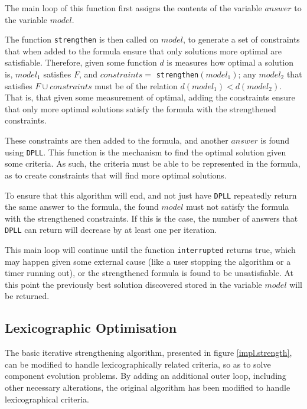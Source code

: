 The main loop of this function first assigns the contents of the variable $answer$ to the variable $model$.

The function \verb+strengthen+ is then called on $model$, to generate a set of constraints that when added to the formula ensure that only solutions more optimal are satisfiable.
Therefore, given some function $d$ is measures how optimal a solution is, $model_1$ satisfies $F$, and $constraints = $ \verb+strengthen+$(model_1)$;
any $model_2$ that satisfies $F \cup constraints$ must be of the relation $d(model_1) < d(model_2)$.
That is, that given some measurement of optimal, adding the constraints ensure that only more optimal solutions satisfy the formula with the strengthened constraints. 

These constraints are then added to the formula, and another $answer$ is found using \verb+DPLL+.
This function is the mechanism to find the optimal solution given some criteria.
As such, the criteria must be able to be represented in the formula, as to create constraints that will find more optimal solutions.

To ensure that this algorithm will end, and not just have \verb+DPLL+ repeatedly return the same answer to the formula, 
the found $model$ must not satisfy the formula with the strengthened constraints.
If this is the case, the number of answers that \verb+DPLL+ can return will decrease by at least one per iteration.

This main loop will continue until the function \verb+interrupted+ returns true, which may happen given some external cause (like a user stopping the algorithm or a timer running out),
or the strengthened formula is found to be unsatisfiable.
At this point the previously best solution discovered stored in the variable $model$ will be returned.

\subsection{Lexicographic Optimisation}
The basic iterative strengthening algorithm, presented in figure \ref{impl.strength}, can be modified to handle lexicographically related criteria, so as to solve component evolution problems.
By adding an additional outer loop, including other necessary alterations, the original algorithm has been modified to handle lexicographical criteria.

